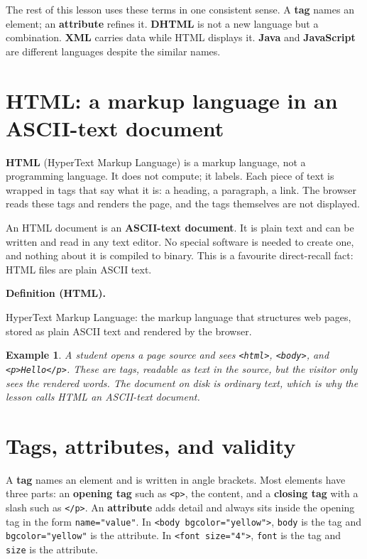 \documentclass[11pt]{article}
\newtheorem{example}{Example}[section]
\newenvironment{definitionbox}[1]{%
  \par\noindent\textbf{Definition (#1).}\ \itshape
}{\par\vspace{0.3em}}
\begin{document}
The rest of this lesson uses these terms in one consistent sense. A \textbf{tag} names an element; an \textbf{attribute} refines it. \textbf{DHTML} is not a new language but a combination. \textbf{XML} carries data while HTML displays it. \textbf{Java} and \textbf{JavaScript} are different languages despite the similar names.

\section{HTML: a markup language in an ASCII-text document}
\textbf{HTML} (HyperText Markup Language) is a markup language, not a programming language. It does not compute; it labels. Each piece of text is wrapped in tags that say what it is: a heading, a paragraph, a link. The browser reads these tags and renders the page, and the tags themselves are not displayed.

An HTML document is an \textbf{ASCII-text document}. It is plain text and can be written and read in any text editor. No special software is needed to create one, and nothing about it is compiled to binary. This is a favourite direct-recall fact: HTML files are plain ASCII text.

\begin{definitionbox}{HTML}
HyperText Markup Language: the markup language that structures web pages, stored as plain ASCII text and rendered by the browser.
\end{definitionbox}

\begin{example}
A student opens a page source and sees \texttt{<html>}, \texttt{<body>}, and \texttt{<p>Hello</p>}. These are tags, readable as text in the source, but the visitor only sees the rendered words. The document on disk is ordinary text, which is why the lesson calls HTML an ASCII-text document.
\end{example}

\section{Tags, attributes, and validity}
A \textbf{tag} names an element and is written in angle brackets. Most elements have three parts: an \textbf{opening tag} such as \texttt{<p>}, the content, and a \textbf{closing tag} with a slash such as \texttt{</p>}. An \textbf{attribute} adds detail and always sits inside the opening tag in the form \texttt{name="value"}. In \texttt{<body bgcolor="yellow">}, \texttt{body} is the tag and \texttt{bgcolor="yellow"} is the attribute. In \texttt{<font size="4">}, \texttt{font} is the tag and \texttt{size} is the attribute.
\end{document}
